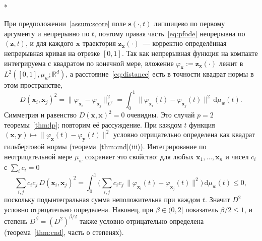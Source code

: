 \documentclass[14pt, a4paper]{extarticle}
\makeatletter
\theoremstyle{definition}
\theoremstyle{plain}
\renewenvironment{proof}[1][\proofname]{\par
    \pushQED{\qed}%
    \normalfont \topsep6\p@\@plus6\p@\relax
    \trivlist
    \item[\hskip\labelsep\itshape #1\@addpunct{.}]\mbox{}\\*
    \ignorespaces
}{\popQED\endtrivlist\@endpefalse}
\makeatother
\begin{document}
\begin{proof}[Доказательство утверждения~\ref{prop:dcnd}]
При предположении~\ref{assum:score} поле $\mathbf{s}(\cdot,t)$ липшицево по первому
аргументу и непрерывно по $t$, поэтому правая часть~\eqref{eq:pfode} непрерывна по
$(\mathbf{z},t)$, и для каждого $\mathbf{x}$ траектория
$\mathbf{z}_{\mathbf{x}}(\cdot)$~--- корректно определённая непрерывная кривая на
отрезке $[0,1]$. Так как непрерывная функция на компакте интегрируема с квадратом по
конечной мере, вложение
$\varphi_{\mathbf{x}}:=\mathbf{z}_{\mathbf{x}}(\cdot)$ лежит в
$L^2([0,1],\mu_w;\mathbb{R}^d)$, а расстояние~\eqref{eq:distance} есть в точности
квадрат нормы в этом пространстве,
\[
    D(\mathbf{x}_i,\mathbf{x}_j)^2
    =\big\|\varphi_{\mathbf{x}_i}-\varphi_{\mathbf{x}_j}\big\|_{L^2}^2
    =\int_0^1\big\|\varphi_{\mathbf{x}_i}(t)-\varphi_{\mathbf{x}_j}(t)\big\|^2
      \,\mathrm{d}\mu_w(t) .
\]
Симметрия и равенство $D(\mathbf{x},\mathbf{x})^2=0$ очевидны. Это случай $p=2$
теоремы~\ref{thm:lp}; повторим её рассуждение. При каждом $t$ функция
$(\mathbf{x},\mathbf{y})\mapsto\|\varphi_{\mathbf{x}}(t)-\varphi_{\mathbf{y}}(t)\|^2$
условно отрицательно определена как квадрат гильбертовой нормы
(теорема~\ref{thm:cnd}(iii)). Интегрирование по неотрицательной мере $\mu_w$
сохраняет это свойство: для любых $\mathbf{x}_1,\dots,\mathbf{x}_n$ и чисел $c_i$ с
$\sum_i c_i=0$
\[
    \sum_{i,j}c_ic_j\,D(\mathbf{x}_i,\mathbf{x}_j)^2
    =\int_0^1\Big(\sum_{i,j}c_ic_j\,
       \|\varphi_{\mathbf{x}_i}(t)-\varphi_{\mathbf{x}_j}(t)\|^2\Big)\,\mathrm{d}\mu_w(t)
    \le0 ,
\]
поскольку подынтегральная сумма неположительна при каждом $t$. Значит $D^2$ условно
отрицательно определена. Наконец, при $\beta\in(0,2]$ показатель $\beta/2\le1$, и
степень $D^{\beta}=(D^2)^{\beta/2}$ также условно отрицательно определена
(теорема~\ref{thm:cnd}, часть о степенях).
\end{proof}
\end{document}
